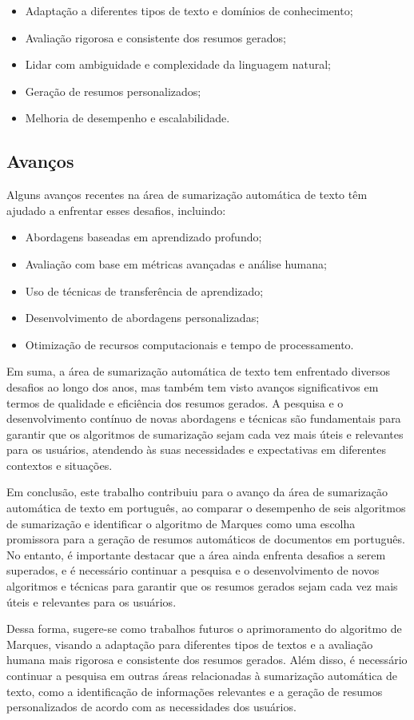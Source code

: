 \begin{itemize}
    \item Adaptação a diferentes tipos de texto e domínios de conhecimento;
    \item Avaliação rigorosa e consistente dos resumos gerados;
    \item Lidar com ambiguidade e complexidade da linguagem natural;
    \item Geração de resumos personalizados;
    \item Melhoria de desempenho e escalabilidade.
\end{itemize}

\subsection{Avanços}
Alguns avanços recentes na área de sumarização automática de texto têm ajudado a enfrentar esses desafios, incluindo:

\begin{itemize}
    \item Abordagens baseadas em aprendizado profundo;
    \item Avaliação com base em métricas avançadas e análise humana;
    \item Uso de técnicas de transferência de aprendizado;
    \item Desenvolvimento de abordagens personalizadas;
    \item Otimização de recursos computacionais e tempo de processamento.
\end{itemize}

Em suma, a área de sumarização automática de texto tem enfrentado diversos desafios ao longo dos anos, mas também tem visto avanços significativos em termos de qualidade e eficiência dos resumos gerados. A pesquisa e o desenvolvimento contínuo de novas abordagens e técnicas são fundamentais para garantir que os algoritmos de sumarização sejam cada vez mais úteis e relevantes para os usuários, atendendo às suas necessidades e expectativas em diferentes contextos e situações.

Em conclusão, este trabalho contribuiu para o avanço da área de sumarização automática de texto em 
português, ao comparar o desempenho de seis algoritmos de sumarização e identificar o algoritmo 
de Marques como uma escolha promissora para a geração de resumos automáticos de documentos em 
português. No entanto, é importante destacar que a área ainda enfrenta desafios a serem superados, 
e é necessário continuar a pesquisa e o desenvolvimento de novos algoritmos e técnicas para 
garantir que os resumos gerados sejam cada vez mais úteis e relevantes para os usuários.

Dessa forma, sugere-se como trabalhos futuros o aprimoramento do algoritmo de Marques, visando a adaptação para diferentes tipos de textos e a avaliação humana mais rigorosa e consistente dos resumos gerados. Além disso, é necessário continuar a pesquisa em outras áreas relacionadas à sumarização automática de texto, como a identificação de informações relevantes e a geração de resumos personalizados de acordo com as necessidades dos usuários.
